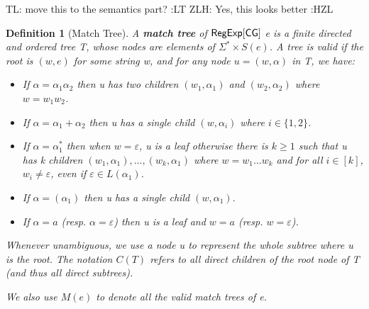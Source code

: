\documentclass[sigplan,review,anonymous]{acmart}\settopmatter{printfolios=true,printccs=false,printacmref=false}
\newcommand{\tl}[1]{\color{blue} {TL: #1 :LT} \color{black}}
\newcommand{\zhilei}[1]{\color{green} {ZLH: #1 :HZL} \color{black}}
\newcommand{\tl}[1]{}
\newcommand{\zhilei}[1]{}
\newcommand{\tmtextbf}[1]{{\bfseries{#1}}}
\newtheorem{definition}{Definition}
\begin{document}
\tl{move this to the semantics part?}
\zhilei{Yes, this looks better}

\begin{definition}[Match Tree]
  A \tmtextbf{match tree} of ${\sf RegExp}[\sf CG]$ e is a finite directed and ordered
  tree T, whose nodes are elements of $\Sigma^{\ast} \times S (e)$. A tree
  is valid if the root is $(w, e)$ for some string w, and for any node $u =
  (w, \alpha)$ in T, we have:
  \begin{itemize}
    \item If $\alpha = \alpha_1 \alpha_2$ then u has two children $(w_1,
    \alpha_1)$ and $(w_2, \alpha_2)$ where $w = w_1 w_2$.
    
    \item If $\alpha = \alpha_1 + \alpha_2$ then u has a single child $(w,
    \alpha_i)$ where $i \in \{ 1, 2 \}$.
    
    \item If $\alpha = \alpha_1^{\ast}$ then when $w = \varepsilon$, u is a
    leaf otherwise there is $k \geqslant 1$ such that u has k children $(w_1,
    \alpha_1), \ldots, (w_k, \alpha_1)$ where $w = w_1 \ldots w_k$ and for all
    $i \in [k]$, $w_i \neq \varepsilon$, even if $\varepsilon \in L
    (\alpha_1)$.
    
    \item If $\alpha = (\alpha_1)$ then u has a single child $(w, \alpha_1)$.
    
    \item If $\alpha = a$ (resp. $\alpha = \varepsilon$) then u is a leaf and
    $w = a$ (resp. $w = \varepsilon$).
  \end{itemize}
 
  Whenever unambiguous, we use a node u to represent the whole subtree
  where u is the root. The notation $C(T)$ refers to all direct children of the root node of T
  (and thus all direct subtrees).
  
  We also use $M (e)$ to denote all the valid match trees of e.
\end{definition}
\end{document}
